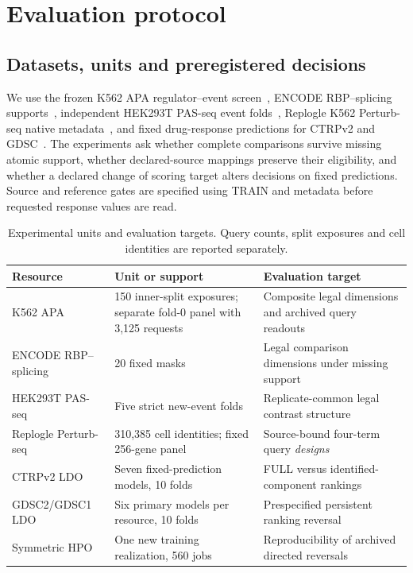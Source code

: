\documentclass[preprint,11pt,times,number,sort&compress]{elsarticle}
\begin{document}
\section{Evaluation protocol}\label{sec:study}
\subsection{Datasets, units and preregistered decisions}
We use the frozen K562 APA regulator--event screen~\cite{kowalski2024cpa}, ENCODE RBP--splicing supports~\cite{vannostrand2020rbp}, independent HEK293T PAS-seq event folds~\cite{jagannatha2026rbp}, Replogle K562 Perturb-seq native metadata~\cite{replogle2022perturbseq}, and fixed drug-response predictions for CTRPv2 and GDSC~\cite{rees2016ctrp,iorio2016gdsc,bernett2026dreval}. The experiments ask whether complete comparisons survive missing atomic support, whether declared-source mappings preserve their eligibility, and whether a declared change of scoring target alters decisions on fixed predictions. Source and reference gates are specified using TRAIN and metadata before requested response values are read.

\begin{table}[t]
\centering\small
\caption{Experimental units and evaluation targets. Query counts, split exposures and cell identities are reported separately.}
\label{tab:resources}
\begin{tabularx}{\textwidth}{@{}L{0.22\textwidth}L{0.31\textwidth}X@{}}
\toprule
Resource & Unit or support & Evaluation target \\\midrule
K562 APA & 150 inner-split exposures; separate fold-0 panel with 3,125 requests & Composite legal dimensions and archived query readouts\\
ENCODE RBP--splicing & 20 fixed masks & Legal comparison dimensions under missing support\\
HEK293T PAS-seq & Five strict new-event folds & Replicate-common legal contrast structure\\
Replogle Perturb-seq & 310,385 cell identities; fixed 256-gene panel & Source-bound four-term query \emph{designs}\\
CTRPv2 LDO & Seven fixed-prediction models, 10 folds & FULL versus identified-component rankings\\
GDSC2/GDSC1 LDO & Six primary models per resource, 10 folds & Prespecified persistent ranking reversal\\
Symmetric HPO & One new training realization, 560 jobs & Reproducibility of archived directed reversals\\
\bottomrule
\end{tabularx}
\end{table}
\end{document}
